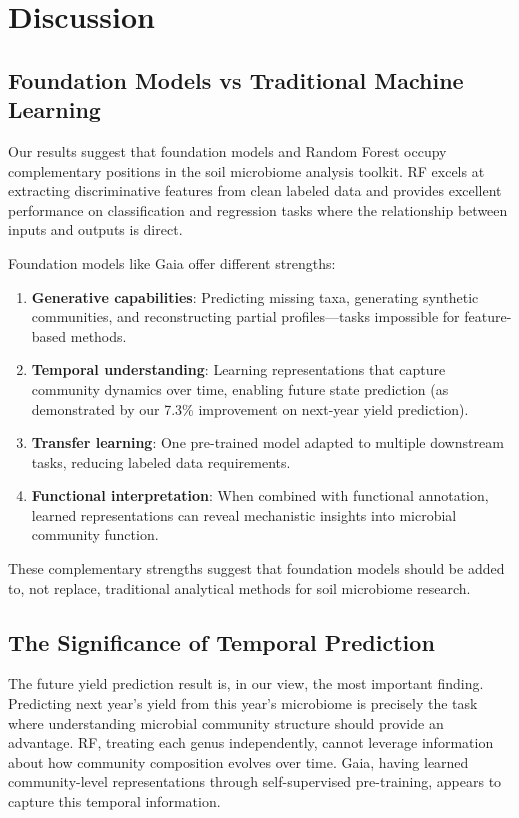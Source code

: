 \documentclass[11pt,a4paper]{article}
\begin{document}
\section{Discussion}

\subsection{Foundation Models vs Traditional Machine Learning}

Our results suggest that foundation models and Random Forest occupy complementary positions in the soil microbiome analysis toolkit. RF excels at extracting discriminative features from clean labeled data and provides excellent performance on classification and regression tasks where the relationship between inputs and outputs is direct.

Foundation models like Gaia offer different strengths:

\begin{enumerate}[leftmargin=1.5em]
    \item \textbf{Generative capabilities}: Predicting missing taxa, generating synthetic communities, and reconstructing partial profiles---tasks impossible for feature-based methods.
    \item \textbf{Temporal understanding}: Learning representations that capture community dynamics over time, enabling future state prediction (as demonstrated by our 7.3\% improvement on next-year yield prediction).
    \item \textbf{Transfer learning}: One pre-trained model adapted to multiple downstream tasks, reducing labeled data requirements.
    \item \textbf{Functional interpretation}: When combined with functional annotation, learned representations can reveal mechanistic insights into microbial community function.
\end{enumerate}

These complementary strengths suggest that foundation models should be added to, not replace, traditional analytical methods for soil microbiome research.

\subsection{The Significance of Temporal Prediction}

The future yield prediction result is, in our view, the most important finding. Predicting next year's yield from this year's microbiome is precisely the task where understanding microbial community structure should provide an advantage. RF, treating each genus independently, cannot leverage information about how community composition evolves over time. Gaia, having learned community-level representations through self-supervised pre-training, appears to capture this temporal information.
\end{document}
